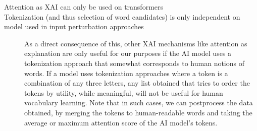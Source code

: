 \begin{description}
	\item[Attention as XAI can only be used on transformers]
	\item[Tokenization (and thus selection of word candidates) is only independent on model used in input perturbation approaches]
		As a direct consequence of this, other XAI mechanisms like attention as explanation are only useful for our purposes if the AI model uses a tokenization approach that somewhat corresponds to human notions of words.
		If a model uses tokenization approaches where a token is a combination of any three letters, any list obtained that tries to order the tokens by utility, while meaningful, will not be useful for human vocabulary learning.
		Note that in such cases, we can postprocess the data obtained, by merging the tokens to human-readable words and taking the average or maximum attention score of the AI model's tokens.
	\item[]
\end{description}


